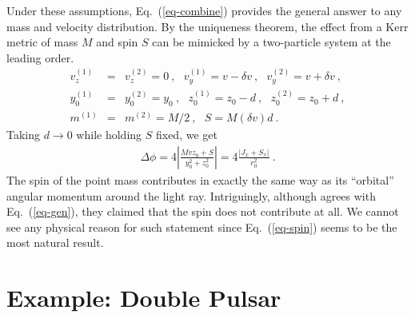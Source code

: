 \documentclass[aps,showpacs,twocolumn,floats,prd,superscriptaddress,nofootinbib]{revtex4}
\begin{document}
Under these assumptions, Eq.~(\ref{eq-combine}) provides the general answer to any mass and velocity distribution. 
By the uniqueness theorem, the effect from a Kerr metric of mass $M$ and spin $S$ can be mimicked by a two-particle system at the leading order.
\begin{eqnarray}
v_z^{(1)} &=& v_z^{(2)} = 0~,  \ \ \ v_y^{(1)} = v -\delta v~, \ \ \ v_y^{(2)} = v + \delta v~, \nonumber \\
y_0^{(1)} &=& y_0^{(2)} = y_0~, \ \ \ z_0^{(1)} = z_0-d~, \ \ \ z_0^{(2)} = z_0 + d~, \nonumber \\
m^{(1)} &=& m^{(2)} = M/2~, \ \ \ S = M (\delta v) d~. 
\end{eqnarray}
Taking $d\rightarrow0$ while holding $S$ fixed, we get
\begin{eqnarray}
\Delta \phi = 4\left|\frac{Mvz_0 + S}{y_0^2 + z_0^2}\right| = 4 \frac{\left| J_x + S_x \right|}{r_0^2}~.
\label{eq-spin}
\end{eqnarray}
The spin of the point mass contributes in exactly the same way as its ``orbital'' angular momentum around the light ray. Intriguingly, although \cite{KopMas01} agrees with Eq.~(\ref{eq-gen}), they claimed that the spin does not contribute at all. We cannot see any physical reason for such statement since Eq.~(\ref{eq-spin}) seems to be the most natural result.









\section{Example: Double Pulsar}
\label{sec-prediction}
\end{document}
